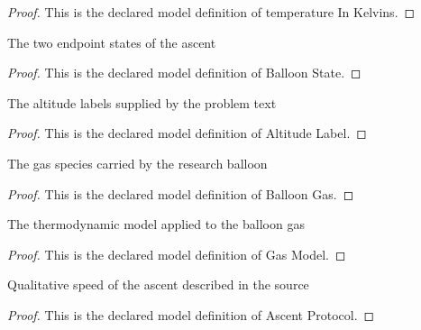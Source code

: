 \begin{proof}
  This is the declared model definition of temperature In Kelvins.
\end{proof}
\begin{definition}
  \label{def:physics:phyx-mini-0345:phyxminiproblems-problemphyxmini0345-balloonstate}
  The two endpoint states of the ascent
\end{definition}
\begin{proof}
  This is the declared model definition of Balloon State.
\end{proof}
\begin{definition}
  \label{def:physics:phyx-mini-0345:phyxminiproblems-problemphyxmini0345-altitudelabel}
  The altitude labels supplied by the problem text
\end{definition}
\begin{proof}
  This is the declared model definition of Altitude Label.
\end{proof}
\begin{definition}
  \label{def:physics:phyx-mini-0345:phyxminiproblems-problemphyxmini0345-balloongas}
  The gas species carried by the research balloon
\end{definition}
\begin{proof}
  This is the declared model definition of Balloon Gas.
\end{proof}
\begin{definition}
  \label{def:physics:phyx-mini-0345:phyxminiproblems-problemphyxmini0345-gasmodel}
  The thermodynamic model applied to the balloon gas
\end{definition}
\begin{proof}
  This is the declared model definition of Gas Model.
\end{proof}
\begin{definition}
  \label{def:physics:phyx-mini-0345:phyxminiproblems-problemphyxmini0345-ascentprotocol}
  Qualitative speed of the ascent described in the source
\end{definition}
\begin{proof}
  This is the declared model definition of Ascent Protocol.
\end{proof}
